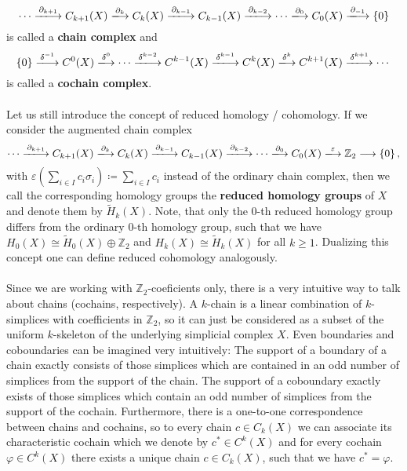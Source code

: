\[
\cdots\xlongrightarrow{\partial_{k+1}} C_{k+1}(X)\xlongrightarrow{\partial_k} C_k(X)\xlongrightarrow{\partial_{k-1}} C_{k-1}(X)\xlongrightarrow{\partial_{k-2}}\cdots\xlongrightarrow{\partial_0} C_0(X)\xlongrightarrow{\partial_{-1}}\left\{0\right\}
\]
is called a \textbf{chain complex} and
\[
\left\{0\right\}\xlongrightarrow{\delta^{-1}}C^0(X)\xlongrightarrow{\delta^0}\cdots\xlongrightarrow{\delta^{k-2}} C^{k-1}(X)\xlongrightarrow{\delta^{k-1}} C^k(X)\xlongrightarrow{\delta^k} C^{k+1}(X)\xlongrightarrow{\delta^{k+1}}\cdots
\]
is called a \textbf{cochain complex}.\\
\\
Let us still introduce the concept of reduced homology / cohomology. If we consider the augmented chain complex
\[
\cdots\xlongrightarrow{\partial_{k+1}} C_{k+1}(X)\xlongrightarrow{\partial_k} C_k(X)\xlongrightarrow{\partial_{k-1}} C_{k-1}(X)\xlongrightarrow{\partial_{k-2}}\cdots\xlongrightarrow{\partial_0} C_0(X)\xlongrightarrow{\varepsilon}\mathbb{Z}_2\longrightarrow \left\{0\right\},
\]
with \(\varepsilon\left(\sum\limits_{i\in I}c_i\sigma_i\right)\coloneqq \sum\limits_{i\in I}c_i\) instead of the ordinary chain complex, then we call the corresponding homology groups the \textbf{reduced homology groups} of \(X\) and denote them by \(\tilde{H}_k(X)\). Note, that only the \(0\)-th reduced homology group differs from the ordinary \(0\)-th homology group, such that we have \(H_0(X)\cong\tilde{H}_0(X)\oplus\mathbb{Z}_2\) and \(H_k(X)\cong\tilde{H}_k(X)\) for all \(k\geq 1\). Dualizing this concept one can define reduced cohomology analogously.\\
\\
Since we are working with \(\mathbb{Z}_2\)-coeficients only, there is a very intuitive way to talk about chains (cochains, respectively). A \(k\)-chain is a linear combination of \(k\)-simplices with coefficients in \(\mathbb{Z}_2\), so it can just be considered as a subset of the uniform \(k\)-skeleton of the underlying simplicial complex \(X\). Even boundaries and coboundaries can be imagined very intuitively: The support of a boundary of a chain exactly consists of those simplices which are contained in an odd number of simplices from the support of the chain. The support of a coboundary exactly exists of those simplices which contain an odd number of simplices from the support of the cochain. Furthermore, there is a one-to-one correspondence between chains and cochains, so to every chain \(c\in C_k(X)\) we can associate its characteristic cochain which we denote by \(c^*\in C^k(X)\) and for every cochain \(\varphi\in C^k(X)\) there exists a unique chain \(c\in C_k(X)\), such that we have \(c^*=\varphi\).\\
